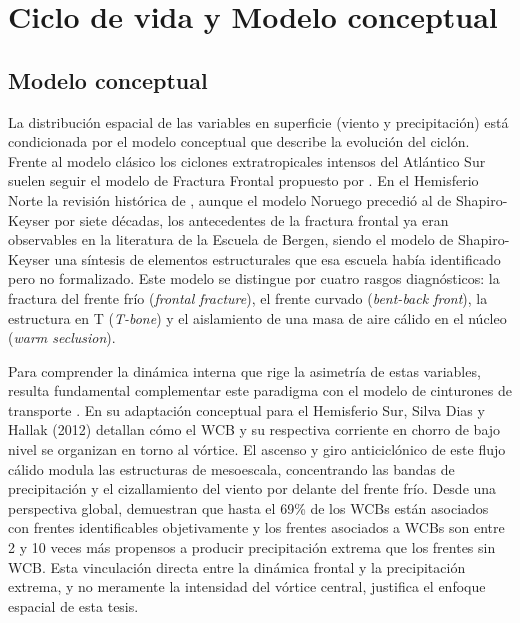 
\section{Ciclo de vida y Modelo conceptual}\label{sec:tb_evolucion}

\subsection{Modelo conceptual}\label{subsec:tb_modelos}

La distribución espacial de las variables en superficie (viento y precipitación) está condicionada por el modelo conceptual que describe la evolución del ciclón. Frente al modelo clásico los ciclones extratropicales intensos del Atlántico Sur suelen seguir el modelo de Fractura Frontal propuesto por \citet{shapiro1990life}. En el Hemisferio Norte la revisión histórica de \citet{schultz2021antecedents}, aunque el modelo Noruego precedió al de Shapiro-Keyser por siete décadas, los antecedentes de la fractura frontal ya eran observables en la literatura de la Escuela de Bergen, siendo el modelo de Shapiro-Keyser una síntesis de elementos estructurales que esa escuela había identificado pero no formalizado. Este modelo se distingue por cuatro rasgos diagnósticos: la fractura del frente frío (\textit{frontal fracture}), el frente curvado (\textit{bent-back front}), la estructura en T (\textit{T-bone}) y el aislamiento de una masa de aire cálido en el núcleo (\textit{warm seclusion}).

Para comprender la dinámica interna que rige la asimetría de estas variables, resulta fundamental complementar este paradigma con el modelo de cinturones de transporte \citep{browning1986conceptual}. En su adaptación conceptual para el Hemisferio Sur, Silva Dias y Hallak (2012) detallan cómo el WCB y su respectiva corriente en chorro de bajo nivel se organizan en torno al vórtice. El ascenso y giro anticiclónico de este flujo cálido modula las estructuras de mesoescala, concentrando las bandas de precipitación y el cizallamiento del viento por delante del frente frío. 
Desde una perspectiva global, \citet{catto2015fronts} demuestran que hasta el 69\% de los WCBs están asociados con frentes identificables objetivamente y los frentes asociados a WCBs son entre 2 y 10 veces más propensos a producir precipitación extrema que los frentes sin WCB. 
Esta vinculación directa entre la dinámica frontal y la precipitación extrema, y no meramente la intensidad del vórtice central, justifica el enfoque espacial de esta tesis.

